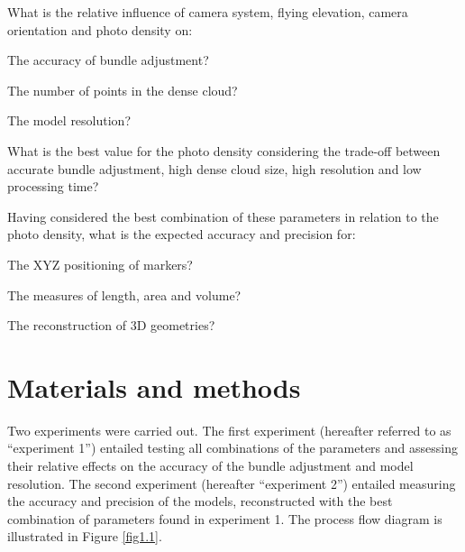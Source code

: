 
\begin{inparaenum}
  \item What is the relative influence of camera system, flying elevation, camera orientation and photo density on:
  \begin{inparaenum}
    \item The accuracy of bundle adjustment?
    \item The number of points in the dense cloud?
    \item The model resolution?
  \end{inparaenum}
  \item What is the best value for the photo density considering the trade-off between accurate bundle adjustment, high dense cloud size, high resolution and low processing time?
   \item Having considered the best combination of these parameters in relation to the photo density, what is the expected accuracy and precision for:
  \begin{inparaenum}
    \item The XYZ positioning of markers? 
    \item The measures of length, area and volume?
    \item The reconstruction of 3D geometries?
  \end{inparaenum}
\end{inparaenum}

\section{Materials and methods}\label{chapitre1_2}

Two experiments were carried out. The first experiment (hereafter referred to as “experiment 1”) entailed testing all combinations of the parameters and assessing their relative effects on the accuracy of the bundle adjustment and model resolution. The second experiment (hereafter “experiment 2”) entailed measuring the accuracy and precision of the models, reconstructed with the best combination of parameters found in experiment 1. The process flow diagram is illustrated in Figure \ref{fig1.1}.

